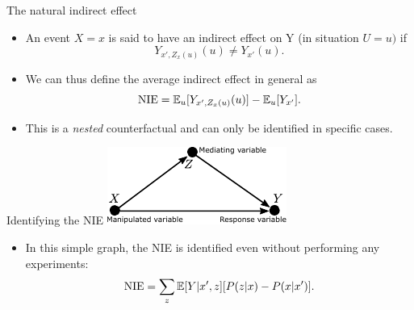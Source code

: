 \begin{frame}{The natural indirect effect}
    \begin{itemize}
        \item An event $X = x$ is said to have an indirect effect on Y (in situation $U = u)$ if
        \begin{equation*}
            Y_{x', Z_x(u)}(u) \neq Y_{x'}(u).
        \end{equation*}
        \item We can thus define the average indirect effect in general as
        \begin{equation*}
            \mathrm{NIE} = \operatorname{\mathbb{E}}_u[Y_{x', Z_x(u)}(u)] - \operatorname{\mathbb{E}}_u[Y_{x'}].
        \end{equation*}
        \item This is a \emph{nested} counterfactual and can only be identified in specific cases.
    \end{itemize}
\end{frame}


\begin{frame}{Identifying the NIE}
    \centering
    \includegraphics[width=0.5\linewidth]{causal_figures/medanal1}%
    \begin{itemize}
        \item In this simple graph, the NIE is identified even without performing any experiments:
        \begin{equation*}
            \mathrm{NIE} = \sum_z\operatorname{\mathbb{E}}[Y | x', z][P(z|x) - P(x | x')].
        \end{equation*}
    \end{itemize}
\end{frame}

